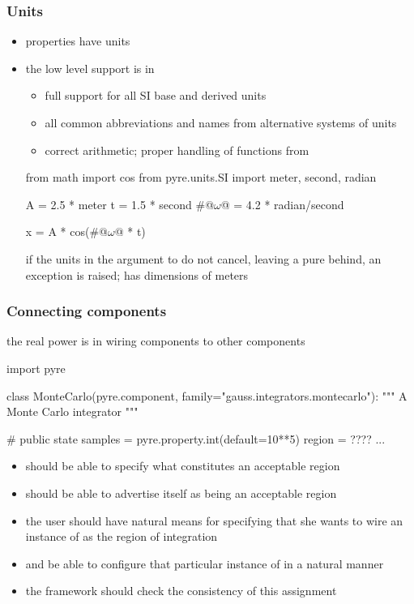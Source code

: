 \begin{frame}[fragile]
%
  \frametitle{Units}
%
  \begin{itemize}
%
  \item {} properties have units
%
  \item the low level support is in 
    \begin{itemize}
    \item full support for all SI base and derived units
    \item all common abbreviations and names from alternative systems of units
    \item correct arithmetic; proper handling of functions from 
    \end{itemize}
%
    \begin{ipython}{}
from math import cos
from pyre.units.SI import meter, second, radian

A = 2.5 * meter
t = 1.5 * second
#@$\omega$@ = 4.2 * radian/second

x = A * cos(#@$\omega$@ * t)
    \end{ipython}
%
    if the units in the argument to  do not cancel, leaving a pure
     behind, an exception is raised;  has dimensions of meters
%
  \end{itemize}
%
\end{frame}

\begin{frame}[fragile]
%
  \frametitle{Connecting components}
%
  the real power is in wiring components to other components
%
  \begin{ipython}{}
import pyre

class MonteCarlo(pyre.component, family="gauss.integrators.montecarlo"):
    """
    A Monte Carlo integrator
    """

    # public state
    samples = pyre.property.int(default=10**5)
    region = ????
    ...
  \end{ipython}
%
  \begin{itemize}
  \item {} should be able to specify what constitutes an acceptable region
  \item {} should be able to advertise itself as being an acceptable
    region
  \item the user should have natural means for specifying that she wants to wire an instance of
     as the region of integration
  \item and be able to configure that particular instance of  in a natural
    manner
  \item the framework should check the consistency of this assignment
  \end{itemize}
%
\end{frame}

